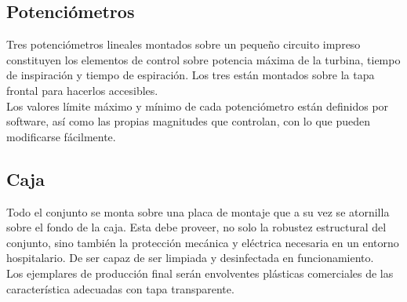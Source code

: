 \subsection{Potenciómetros}
    Tres potenciómetros lineales montados sobre un pequeño circuito impreso constituyen los elementos de control sobre potencia máxima de la turbina, tiempo de inspiración y tiempo de espiración. Los tres están montados sobre la tapa frontal para hacerlos accesibles.\\
    Los valores límite máximo y mínimo de cada potenciómetro están definidos por software, así como las propias magnitudes que controlan, con lo que pueden modificarse fácilmente.

\subsection{Caja}
    Todo el conjunto se monta sobre una placa de montaje que a su vez se atornilla sobre el fondo de la caja. Esta debe proveer, no solo la robustez estructural del conjunto, sino también la protección mecánica y eléctrica necesaria en un entorno hospitalario. De ser capaz de ser limpiada y desinfectada en funcionamiento.\\
    Los ejemplares de producción final serán envolventes plásticas comerciales de las característica adecuadas con tapa transparente.
